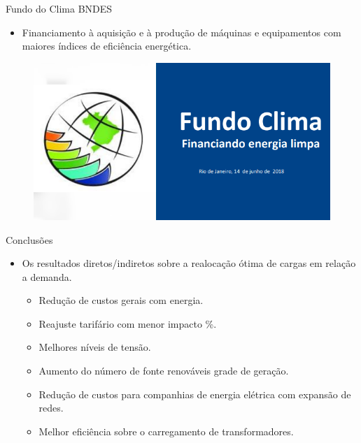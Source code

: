 \begin{frame}
  \begin{block}{Fundo do Clima BNDES}
   \begin{itemize}
     \item Financiamento à aquisição e à produção de máquinas e equipamentos
      com maiores índices de eficiência energética.
   \end{itemize}
  \end{block}
  \begin{figure}[h]
  	\begin{center}
      \includegraphics [scale=0.3]{./Figures/t10}
  	\end{center}
  \end{figure}
\end{frame}

\begin{frame}
  \begin{block}{Conclusões}
   \begin{itemize}
     \item Os resultados diretos/indiretos sobre a realocação ótima de cargas
       em relação a demanda.
       \begin{itemize}
         \item Redução de custos gerais com energia.
         \item Reajuste tarifário com menor impacto \%.
         \item Melhores níveis de tensão.
         \item Aumento do número de fonte renováveis grade de geração.
         \item Redução de custos para companhias de energia elétrica com
           expansão de redes.
         \item Melhor eficiência sobre o carregamento de transformadores.
       \end{itemize}
   \end{itemize}
  \end{block}
\end{frame}

